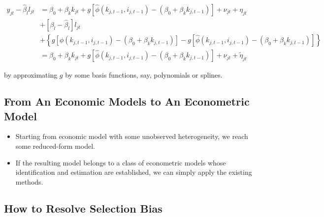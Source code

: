 \documentclass[]{book}
\providecommand{\tightlist}{%
  \setlength{\itemsep}{0pt}\setlength{\parskip}{0pt}}
\theoremstyle{definition}
\theoremstyle{definition}
\theoremstyle{definition}
\theoremstyle{remark}
\begin{document}
\begin{itemize}
  \begin{equation}
  \begin{split}
  y_{jt} - \hat{\beta}_l l_{jt}& = \beta_0 + \beta_k k_{jt} + g[\hat{\phi}(k_{j, t - 1}, i_{j, t - 1}) - (\beta_0 + \beta_k k_{j, t - 1})] + \nu_{jt} + \eta_{jt}\\
  &+ [\beta_l - \hat{\beta}_l] l_{jt}\\
  &+ \left\{g[\phi(k_{j, t - 1}, i_{j, t - 1}) - (\beta_0 + \beta_k k_{j, t - 1})] - g[\hat{\phi}(k_{j, t - 1}, i_{j, t - 1}) - (\beta_0 + \beta_k k_{j, t - 1})]\right\}\\
  & = \beta_0 + \beta_k k_{jt} + g[\hat{\phi}(k_{j, t - 1}, i_{j, t - 1}) - (\beta_0 + \beta_k k_{j, t - 1})] + \nu_{jt} + \tilde{\eta}_{jt}
  \end{split}
  \end{equation}

  by approximating \(g\) by some basis functions, say, polynomials or
  splines.
\end{itemize}

\subsection{From An Economic Models to An Econometric
Model}\label{from-an-economic-models-to-an-econometric-model}

\begin{itemize}
\tightlist
\item
  Starting from economic model with some unobserved heterogeneity, we
  reach some reduced-form model.
\item
  If the resulting model belongs to a class of econometric models whose
  identification and estimation are established, we can simply apply the
  existing methods.
\end{itemize}

\subsection{How to Resolve Selection
Bias}\label{how-to-resolve-selection-bias}
\end{document}
